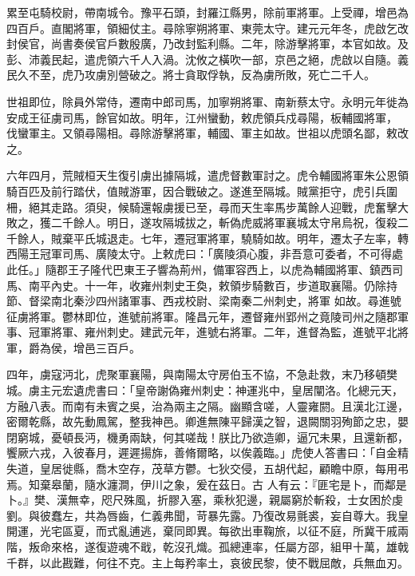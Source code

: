\begin{pinyinscope}
 累至屯騎校尉，帶南城令。豫平石頭，封羅江縣男，除前軍將軍。上受禪，增邑為四百戶。直閣將軍，領細仗主。尋除寧朔將軍、東莞太守。建元元年冬，虎啟乞改封侯官，尚書奏侯官戶數殷廣，乃改封監利縣。二年，除游擊將軍，本官如故。及彭、沛義民起，遣虎領六千人入渦。沈攸之橫吹一部，京邑之絕，虎啟以自隨。義民久不至，虎乃攻虜別營破之。將士貪取俘執，反為虜所敗，死亡二千人。



 世祖即位，除員外常侍，遷南中郎司馬，加寧朔將軍、南新蔡太守。永明元年徙為安成王征虜司馬，餘官如故。明年，江州蠻動，敕虎領兵戍尋陽，板輔國將軍，
 伐蠻軍主。又領尋陽相。尋除游擊將軍，輔國、軍主如故。世祖以虎頭名鄙，敕改之。



 六年四月，荒賊桓天生復引虜出據隔城，遣虎督數軍討之。虎令輔國將軍朱公恩領騎百匹及前行踏伏，值賊游軍，因合戰破之。遂進至隔城。賊黨拒守，虎引兵圍柵，絕其走路。須臾，候騎還報虜援已至，尋而天生率馬步萬餘人迎戰，虎奮擊大敗之，獲二千餘人。明日，遂攻隔城拔之，斬偽虎威將軍襄城太守帛烏祝，復殺二千餘人，賊棄平氏城退走。七年，遷冠軍將軍，驍騎如故。明年，遷太子左率，轉西陽王冠軍司馬、廣陵太守。上敕虎曰：「廣陵須心腹，非吾意可委者，不可得處此任。」隨郡王子隆代巴東王子響為荊州，備軍容西上，以虎為輔國將軍、鎮西司馬、南平內史。十一年，收雍州刺史王奐，敕領步騎數百，步道取襄陽。仍除持節、督梁南北秦沙四州諸軍事、西戎校尉、梁南秦二州刺史，將軍
 如故。尋進號征虜將軍。鬱林即位，進號前將軍。隆昌元年，遷督雍州郢州之竟陵司州之隨郡軍事、冠軍將軍、雍州刺史。建武元年，進號右將軍。二年，進督為監，進號平北將軍，爵為侯，增邑三百戶。



 四年，虜寇沔北，虎聚軍襄陽，與南陽太守房伯玉不協，不急赴救，末乃移頓樊城。虜主元宏遺虎書曰：「皇帝謝偽雍州刺史：神運兆中，皇居闡洛。化總元天，方融八表。而南有未賓之吳，治為兩主之隔。幽顯含嗟，人靈雍閼。且漢北江邊，密爾乾縣，故先動鳳駕，整我神邑。卿進無陳平歸漢之智，退闕關羽殉節之忠，嬰閉窮城，憂頓長沔，機勇兩缺，何其嗟哉！朕比乃欲造卿，逼冗未果，且還新都，饗厥六戎，入彼春月，遲遲揚旆，善脩爾略，以俟義臨。」虎使人答書曰：「自金精失道，皇居徙縣，喬木空存，茂草方鬱。七狄交侵，五胡代起，顧瞻中原，每用弔焉。知棄皋蘭，隨水瀍澗，伊川之象，爰在茲日。古
 人有云：『匪宅是卜，而鄰是卜。』樊、漢無幸，咫尺殊風，折膠入塞，乘秋犯邊，親屬窮於斬殺，士女困於虔劉。與彼蠢左，共為唇齒，仁義弗聞，苛暴先露。乃復改易氈裘，妄自尊大。我皇開運，光宅區夏，而式亂逋逃，棄同即異。每欲出車鞠旅，以征不庭，所冀干戚兩階，叛命來格，遂復遊魂不戢，乾沒孔熾。孤總連率，任屬方邵，組甲十萬，雄戟千群，以此戡難，何往不克。主上每矜率土，哀彼民黎，使不戰屈敵，兵無血刃。




\end{pinyinscope}
